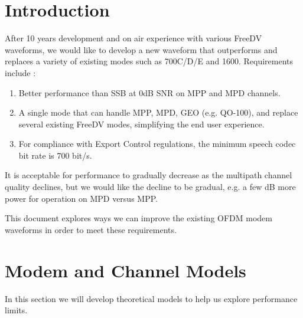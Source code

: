 \documentclass{article}
\begin{document}

\section{Introduction}

After 10 years development and on air experience with various FreeDV waveforms, we would like to develop a new waveform that outperforms and replaces a variety of existing modes such as 700C/D/E and 1600.  Requirements include \cite{freedv-020}:
\begin{enumerate}
\item Better performance than SSB at 0dB SNR on MPP and MPD channels.
\item A single mode that can handle MPP, MPD, GEO (e.g. QO-100), and replace several existing FreeDV modes, simplifying the end user experience.
\item For compliance with Export Control regulations, the minimum speech codec bit rate is 700 bit/s.
\end{enumerate}
It is acceptable for performance to gradually decrease as the multipath channel quality declines, but we would like the decline to be gradual, e.g. a few dB more power for operation on MPD versus MPP.

This document explores ways we can improve the existing OFDM modem waveforms in order to meet these requirements.

\section{Modem and Channel Models}

In this section we will develop theoretical models to help us explore performance limits.
\end{document}
